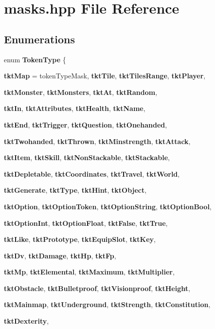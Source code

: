 \section{masks.hpp File Reference}
\label{masks_8hpp}
\subsection*{Enumerations}
\begin{CompactItemize}
\item 
enum {\bf Token\-Type} \{ \par
{\bf tkt\-Map} =  token\-Type\-Mask, 
{\bf tkt\-Tile}, 
{\bf tkt\-Tiles\-Range}, 
{\bf tkt\-Player}, 
\par
{\bf tkt\-Monster}, 
{\bf tkt\-Monsters}, 
{\bf tkt\-At}, 
{\bf tkt\-Random}, 
\par
{\bf tkt\-In}, 
{\bf tkt\-Attributes}, 
{\bf tkt\-Health}, 
{\bf tkt\-Name}, 
\par
{\bf tkt\-End}, 
{\bf tkt\-Trigger}, 
{\bf tkt\-Question}, 
{\bf tkt\-Onehanded}, 
\par
{\bf tkt\-Twohanded}, 
{\bf tkt\-Thrown}, 
{\bf tkt\-Minstrength}, 
{\bf tkt\-Attack}, 
\par
{\bf tkt\-Item}, 
{\bf tkt\-Skill}, 
{\bf tkt\-Non\-Stackable}, 
{\bf tkt\-Stackable}, 
\par
{\bf tkt\-Depletable}, 
{\bf tkt\-Coordinates}, 
{\bf tkt\-Travel}, 
{\bf tkt\-World}, 
\par
{\bf tkt\-Generate}, 
{\bf tkt\-Type}, 
{\bf tkt\-Hint}, 
{\bf tkt\-Object}, 
\par
{\bf tkt\-Option}, 
{\bf tkt\-Option\-Token}, 
{\bf tkt\-Option\-String}, 
{\bf tkt\-Option\-Bool}, 
\par
{\bf tkt\-Option\-Int}, 
{\bf tkt\-Option\-Float}, 
{\bf tkt\-False}, 
{\bf tkt\-True}, 
\par
{\bf tkt\-Like}, 
{\bf tkt\-Prototype}, 
{\bf tkt\-Equip\-Slot}, 
{\bf tkt\-Key}, 
\par
{\bf tkt\-Dv}, 
{\bf tkt\-Damage}, 
{\bf tkt\-Hp}, 
{\bf tkt\-Fp}, 
\par
{\bf tkt\-Mp}, 
{\bf tkt\-Elemental}, 
{\bf tkt\-Maximum}, 
{\bf tkt\-Multiplier}, 
\par
{\bf tkt\-Obstacle}, 
{\bf tkt\-Bulletproof}, 
{\bf tkt\-Visionproof}, 
{\bf tkt\-Height}, 
\par
{\bf tkt\-Mainmap}, 
{\bf tkt\-Underground}, 
{\bf tkt\-Strength}, 
{\bf tkt\-Constitution}, 
\par
{\bf tkt\-Dexterity}, 

\end{CompactItemize}
